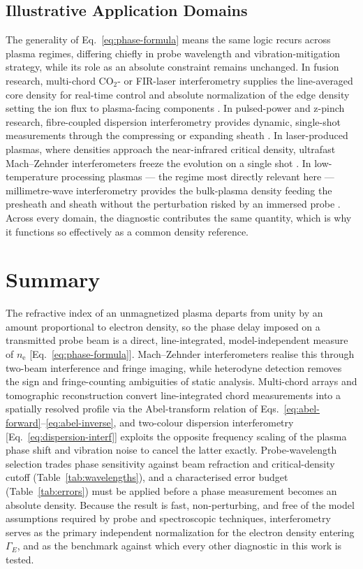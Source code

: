 \subsection{Illustrative Application Domains}

The generality of Eq.~\eqref{eq:phase-formula} means the same logic recurs across plasma regimes, differing chiefly in probe wavelength and vibration-mitigation strategy, while its role as an absolute constraint remains unchanged. In fusion research, multi-chord CO$_{2}$- or FIR-laser interferometry supplies the line-averaged core density for real-time control and absolute normalization of the edge density setting the ion flux to plasma-facing components \cite{ref0399}. In pulsed-power and z-pinch research, fibre-coupled dispersion interferometry provides dynamic, single-shot measurements through the compressing or expanding sheath \cite{ref0417}. In laser-produced plasmas, where densities approach the near-infrared critical density, ultrafast Mach--Zehnder interferometers freeze the evolution on a single shot \cite{ref0391}. In low-temperature processing plasmas — the regime most directly relevant here — millimetre-wave interferometry provides the bulk-plasma density feeding the presheath and sheath without the perturbation risked by an immersed probe \cite{ref0400}. Across every domain, the diagnostic contributes the same quantity, which is why it functions so effectively as a common density reference.

\section{Summary}
\label{sec:interf-summary}

The refractive index of an unmagnetized plasma departs from unity by an amount proportional to electron density, so the phase delay imposed on a transmitted probe beam is a direct, line-integrated, model-independent measure of $n_{\mathrm{e}}$ [Eq.~\eqref{eq:phase-formula}]. Mach--Zehnder interferometers realise this through two-beam interference and fringe imaging, while heterodyne detection removes the sign and fringe-counting ambiguities of static analysis. Multi-chord arrays and tomographic reconstruction convert line-integrated chord measurements into a spatially resolved profile via the Abel-transform relation of Eqs.~\eqref{eq:abel-forward}--\eqref{eq:abel-inverse}, and two-colour dispersion interferometry [Eq.~\eqref{eq:dispersion-interf}] exploits the opposite frequency scaling of the plasma phase shift and vibration noise to cancel the latter exactly. Probe-wavelength selection trades phase sensitivity against beam refraction and critical-density cutoff (Table~\ref{tab:wavelengths}), and a characterised error budget (Table~\ref{tab:errors}) must be applied before a phase measurement becomes an absolute density. Because the result is fast, non-perturbing, and free of the model assumptions required by probe and spectroscopic techniques, interferometry serves as the primary independent normalization for the electron density entering $\Gamma_{E}$, and as the benchmark against which every other diagnostic in this work is tested.
